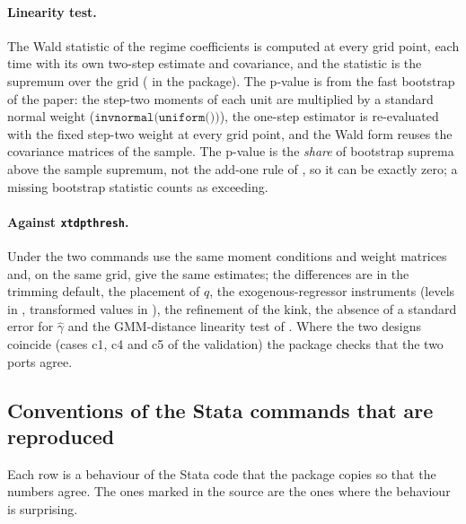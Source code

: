 \documentclass[
  10.5pt,
  a4paper,
]{article}
\begin{document}
\paragraph{Linearity test.} The Wald statistic of the regime coefficients is computed at every grid point, each time
with its own two-step estimate and covariance, and the statistic is the supremum over the grid
( in the package). The p-value is from the fast bootstrap of the paper: the step-two moments of each
unit are multiplied by a standard normal weight ($\texttt{invnormal(uniform())}$), the one-step estimator is
re-evaluated with the fixed step-two weight at every grid point, and the Wald form reuses the covariance matrices of the
sample. The p-value is the \emph{share} of bootstrap suprema above the sample supremum, not the add-one rule of
, so it can be exactly zero; a missing bootstrap statistic counts as exceeding.

\paragraph{Against \texttt{xtdpthresh}.} Under  the two commands use the same moment conditions and
weight matrices and, on the same grid, give the same estimates; the differences are in the trimming default, the
placement of $q$, the exogenous-regressor instruments (levels in , transformed values in
), the refinement of the kink, the absence of a standard error for $\hat\gamma$ and the GMM-distance
linearity test of . Where the two designs coincide (cases c1, c4 and c5 of the validation) the package
checks that the two ports agree.

\subsection{Conventions of the Stata commands that are reproduced}\label{note:quirks}

Each row is a behaviour of the Stata code that the package copies so that the numbers agree. The ones marked
 in the source are the ones where the behaviour is surprising.
\end{document}
